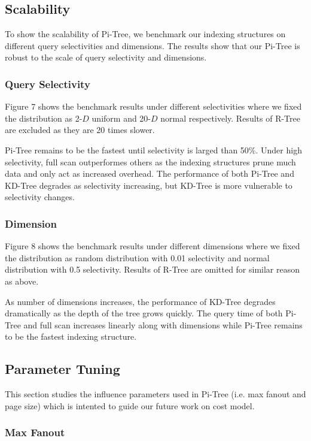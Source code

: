 \documentclass[sigconf,10pt]{acmart}
\begin{document}
\subsection{Scalability}

To show the scalability of Pi-Tree, we benchmark our indexing structures on different
query selectivities and dimensions. The results show that our Pi-Tree is robust to the
scale of query selectivity and dimensions.

\subsubsection{Query Selectivity}

Figure 7 shows the benchmark results under different selectivities where we fixed the
distribution as 2-$D$ uniform and 20-$D$ normal respectively. Results of R-Tree are excluded
as they are 20 times slower.

Pi-Tree remains to be the fastest until selectivity is larged than 50\%. Under high selectivity,
full scan outperformes others as the indexing structures prune much data and only act as
increased overhead. The performance of both Pi-Tree and KD-Tree degrades
as selectivity increasing, but KD-Tree is more vulnerable to selectivity changes.

\subsubsection{Dimension}

Figure 8 shows the benchmark results under different dimensions where we fixed the
distribution as random distribution with 0.01 selectivity and normal distribution with
0.5 selectivity. Results of R-Tree are omitted for similar reason as above.

As number of dimensions increases, the performance of KD-Tree degrades dramatically as
the depth of the tree grows quickly. The query time of both Pi-Tree and full scan increases
linearly along with dimensions while Pi-Tree remains to be the fastest indexing structure.

\subsection{Parameter Tuning}

This section studies the influence parameters used in Pi-Tree (i.e. max fanout and page size)
which is intented to guide our future work on cost model.

\subsubsection{Max Fanout}
\end{document}
